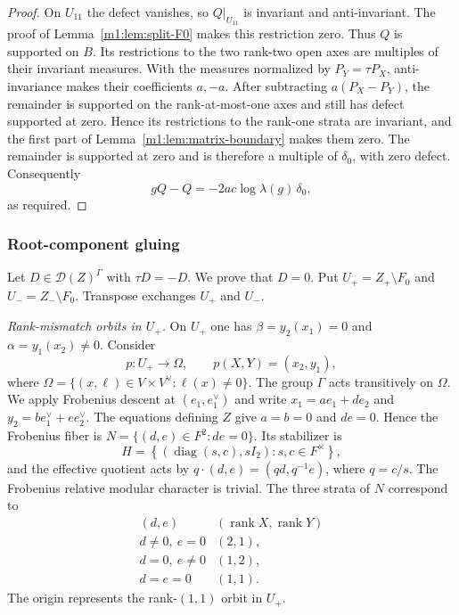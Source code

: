 \begin{proof}
On $U_{11}$ the defect vanishes, so $Q|_{U_{11}}$ is invariant and
anti-invariant. The proof of Lemma~\ref{m1:lem:split-F0} makes this restriction
zero. Thus $Q$ is supported on $B$. Its restrictions to the two rank-two
open axes are multiples of their invariant measures. With the measures
normalized by $P_Y=\tau P_X$, anti-invariance makes their coefficients
$a,-a$. After subtracting $a(P_X-P_Y)$, the remainder is supported
on the rank-at-most-one axes and still has defect supported at zero. Hence its
restrictions to the rank-one strata are invariant, and the first part of
Lemma~\ref{m1:lem:matrix-boundary} makes them zero. The remainder is supported
at zero and is therefore a multiple of $\delta_0$, with zero defect.
Consequently
\[
 gQ-Q=-2ac\log\lambda(g)\,\delta_0,
\]
as required.
\end{proof}

\subsubsection{Root-component gluing}\label{m1:subsec:root-gluing}

Let \(D\in\mathcal D(Z)^\Gamma\) with \(\tau D=-D\). We prove that $D=0$.  Put \(U_+=Z_+\setminus
F_0\) and \(U_-=Z_-\setminus F_0\). Transpose exchanges $U_+$ and $U_-$.

\emph{Rank-mismatch orbits in $U_+$.}
On $U_+$ one has \(\beta=y_2(x_1)=0\) and \(\alpha=y_1(x_2)\neq0\). Consider
\[
    p:U_+\longrightarrow
    \Omega,
    \qquad
    p(X,Y)=(x_2,y_1),
\]
where \(\Omega=\{(x,\ell)\in V\times V^\vee:\ell(x)\neq0\}\). The group $\Gamma$ acts transitively on
$\Omega$. We apply Frobenius descent at
$(e_1,e_1^\vee)$ and write \(x_1=ae_1+de_2\) and \(y_2=be_1^\vee+ee_2^\vee\). The equations
defining $Z$ give \(a=b=0\) and \(de=0\). Hence the Frobenius fiber is \(N=\{(d,e)\in
F^2:de=0\}\). Its stabilizer is
\[
    H=
    \left\{
    \left(\operatorname{diag}(s,c),sI_2\right):
    s,c\in F^\times
    \right\},
\]
and the effective quotient acts by \(q\cdot(d,e)=(qd,q^{-1}e)\), where \(q=c/s\). The Frobenius
relative modular character is trivial.  The three strata of
$N$ correspond to
\[
\begin{array}{c|c}
(d,e) & (\operatorname{rank}X,\operatorname{rank}Y)\\ \hline
 d\neq0,\ e=0 & (2,1),\\
 d=0,\ e\neq0 & (1,2),\\
 d=e=0 & (1,1).
\end{array}
\]
The origin represents the rank-$(1,1)$ orbit in $U_+$.

